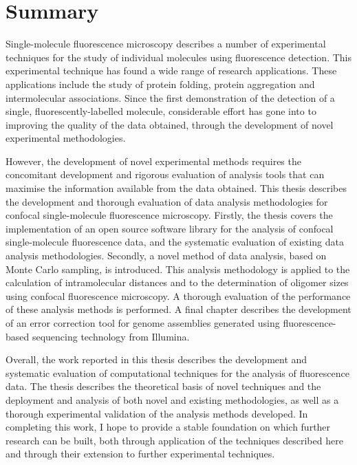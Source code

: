 \chapter*{Summary}
Single-molecule fluorescence microscopy describes a number of experimental techniques for the study of individual molecules using fluorescence detection. This experimental technique has found a wide range of research applications. These applications include the study of protein folding, protein aggregation and intermolecular associations. Since the first demonstration of the detection of a single, fluorescently-labelled molecule, considerable effort has gone into to improving the quality of the data obtained, through the development of novel experimental methodologies.

However, the development of novel experimental methods requires the concomitant development and rigorous evaluation of analysis tools that can maximise the information available from the data obtained. This thesis describes the development and thorough evaluation of data analysis methodologies for confocal single-molecule fluorescence microscopy. Firstly, the thesis covers the implementation of an open source software library for the analysis of confocal single-molecule fluorescence data, and the systematic evaluation of existing data analysis methodologies. Secondly, a novel method of data analysis, based on Monte Carlo sampling, is introduced. This analysis methodology is applied to the calculation of intramolecular distances and to the determination of oligomer sizes using confocal fluorescence microscopy. A thorough evaluation of the performance of these analysis methods is performed. A final chapter describes the development of an error correction tool for genome assemblies generated using fluorescence-based sequencing technology from Illumina.

Overall, the work reported in this thesis describes the development and systematic evaluation of computational techniques for the analysis of fluorescence data. The thesis describes the theoretical basis of novel techniques and the deployment and analysis of both novel and existing methodologies, as well as a thorough experimental validation of the analysis methods developed. In completing this work, I hope to provide a stable foundation on which further research can be built, both through application of the techniques described here and through their extension to further experimental techniques.

